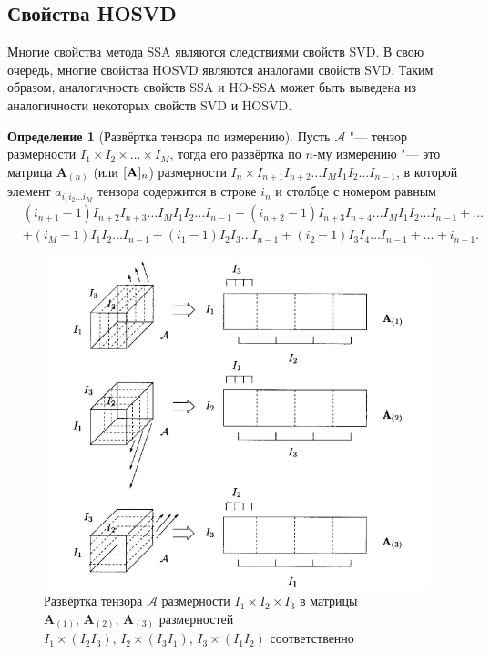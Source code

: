 \documentclass[specialist,
    substylefile = spbu_report.rtx,
    subf,href,colorlinks=true, 12pt]{disser}
\theoremstyle{plain}
\theoremstyle{definition}
\newtheorem{definition}{Определение}[section]
\theoremstyle{remark}
\begin{document}
    \subsection{Свойства HOSVD}\label{subsec:hosvd-properties}
    Многие свойства метода SSA являются следствиями свойств SVD\@.
    В свою очередь, многие свойства HOSVD являются аналогами свойств SVD\@.
    Таким образом, аналогичность свойств SSA и HO-SSA может быть выведена из аналогичности некоторых свойств SVD и HOSVD\@.
    \begin{definition}[Развёртка тензора по измерению]
        Пусть $\mathcal{A}$ "--- тензор размерности $I_1\times I_2\times\ldots\times I_M$, тогда его развёртка
        по $n$-му измерению "--- это матрица $\mathbf{A}_{(n)}$ (или $[\mathbf{A}]_n$)
        размерности $I_n\times I_{n+1}I_{n+2}\ldots I_{M}I_{1}I_{2}\ldots I_{n-1}$,
        в которой элемент $a_{i_1 i_2\ldots i_M}$ тензора содержится в строке $i_n$ и столбце с номером равным
        \[\begin{aligned}
              &(i_{n+1} - 1)I_{n+2}I_{n+3}\ldots I_{M}I_1 I_2\ldots I_{n-1} + (i_{n+2} - 1)I_{n+3}I_{n+4}\ldots I_M I_1 I_2 \ldots
              I_{n-1} + \dots \\
              &+(i_M - 1)I_1 I_2 \ldots I_{n-1} + (i_1 - 1)I_2 I_3\ldots I_{n-1} + (i_2 - 1)I_3 I_4\ldots I_{n-1} + \dots + i_{n-1}.
        \end{aligned}
        \]

        \begin{figure}[!h]
            \centering
            \includegraphics[width=\textwidth]{unfolding}
            \caption{Развёртка тензора $\mathcal{A}$ размерности $I_1\times I_2 \times I_3$ в матрицы $\mathbf{A}_{(1)},\,
            \mathbf{A}_{(2)},\, \mathbf{A}_{(3)}$ размерностей $I_1\times (I_2 I_3),\, I_2\times (I_3 I_1),\, I_3\times (I_1 I_2)$
                соответственно}
            \label{fig:unfolding}
        \end{figure}
    \end{definition}
\end{document}
